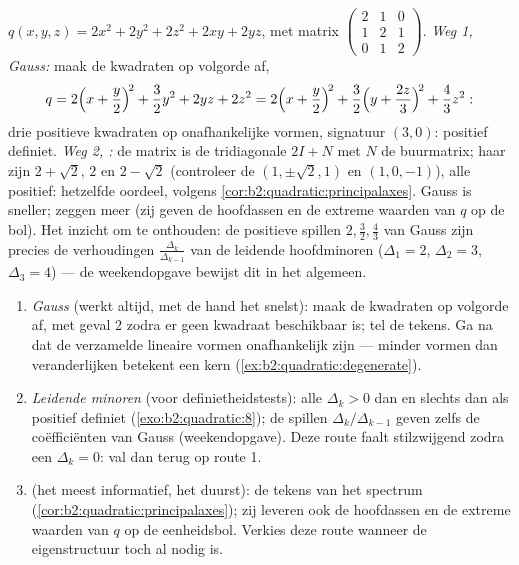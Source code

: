 \begin{example}\label{ex:b2:quadratic:tworoads}
$q(x, y, z) = 2x^2 + 2y^2 + 2z^2 + 2xy + 2yz$, met matrix
$\begin{pmatrix} 2 & 1 & 0\\ 1 & 2 & 1\\ 0 & 1 & 2
\end{pmatrix}$. \emph{Weg 1, Gauss:} maak de kwadraten op volgorde
af,
\[
q = 2\Bigl(x + \frac y2\Bigr)^{\!2} + \frac32 y^2 + 2yz + 2z^2
= 2\Bigl(x + \frac y2\Bigr)^{\!2}
+ \frac32\Bigl(y + \frac{2z}{3}\Bigr)^{\!2} + \frac43 z^2 :
\]
drie positieve kwadraten op onafhankelijke vormen, signatuur $(3,
0)$: positief definiet. \emph{Weg 2, :} de matrix is de
tridiagonale $2I + N$ met $N$ de buurmatrix; haar  zijn
$2 + \sqrt2$, $2$ en $2 - \sqrt2$ (controleer de  $(1,
\pm\sqrt2, 1)$ en $(1, 0, -1)$), alle positief: hetzelfde oordeel,
volgens \cref{cor:b2:quadratic:principalaxes}. Gauss is sneller;
 zeggen meer (zij geven de hoofdassen en de extreme
waarden van $q$ op de bol). Het inzicht om te onthouden: de
positieve spillen $2, \frac32, \frac43$ van Gauss zijn precies de
verhoudingen $\frac{\Delta_k}{\Delta_{k-1}}$ van de leidende
hoofdminoren ($\Delta_1 = 2$, $\Delta_2 = 3$, $\Delta_3 = 4$) --- de
weekendopgave bewijst dit in het algemeen.
\end{example}

\begin{method}\label{met:b2:quadratic:signature}
\begin{enumerate}
  \item \emph{Gauss} (werkt altijd, met de hand het snelst): maak
        de kwadraten op volgorde af, met geval 2 zodra er geen
        kwadraat beschikbaar is; tel de tekens. Ga na dat de
        verzamelde lineaire vormen onafhankelijk zijn --- minder
        vormen dan veranderlijken betekent een kern
        (\cref{ex:b2:quadratic:degenerate}).
  \item \emph{Leidende minoren} (voor definietheidstests): alle
        $\Delta_k > 0$ dan en slechts dan als positief definiet
        (\cref{exo:b2:quadratic:8}); de spillen
        $\Delta_k/\Delta_{k-1}$ geven zelfs de coëfficiënten van
        Gauss (weekendopgave). Deze route faalt stilzwijgend zodra
        een $\Delta_k = 0$: val dan terug op route 1.
  \item \emph{} (het meest informatief, het duurst):
        de tekens van het spectrum
        (\cref{cor:b2:quadratic:principalaxes}); zij leveren ook
        de hoofdassen en de extreme waarden van $q$ op de
        eenheidsbol. Verkies deze route wanneer de
        eigenstructuur toch al nodig is.
\end{enumerate}
\end{method}

